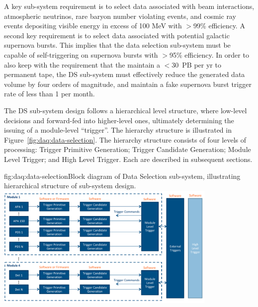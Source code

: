 A key sub-system requirement is to select data associated with beam
interactions, atmospheric neutrinos, rare baryon number violating events,
and cosmic ray events depositing visible energy in excess of 100 MeV
with $\gt$99\% efficiency. A second key requirement is to select data
associated with potential galactic supernova bursts. This implies that
the data selection sub-system must be capable of self-triggering on
supernova bursts with $\gt$95\% efficiency. In order to also keep with the
requirement that the   maintain a $\lt$30~PB per yr to permanent
tape, the DS sub-system must effectively reduce the generated data
volume by four orders of magnitude, and maintain a fake supernova
burst trigger rate of less than 1 per month.

The DS sub-system design follows a hierarchical level structure, where low-level
decisions and forward-fed into higher-level ones, ultimately
determining the issuing of a  module-level ``trigger''. The hierarchy
structure is illustrated in Figure~\ref{fig:daq:data-selection}. The hierarchy structure
consists of four levels of processing: Trigger Primitive Generation;
Trigger Candidate Generation; Module Level Trigger; and High Level
Trigger. Each are described in subsequent sections.

\begin{dunefigure}{fig:daq:data-selection}{Block diagram of  
    Data Selection sub-system, illustrating hierarchical structure of
    sub-system design.}
  \includegraphics[width=0.8\textwidth]{ch-sp-daq/DUNE_TDR_SP_DAQ_DS_Figure.pdf}
\end{dunefigure}

